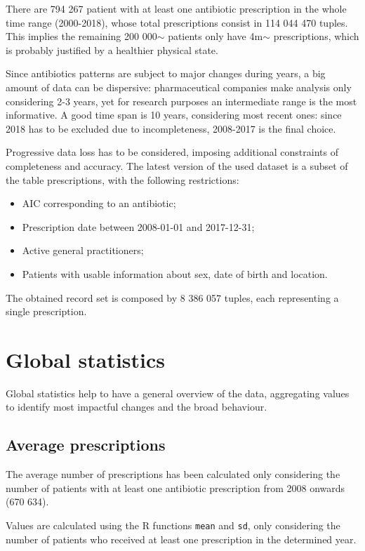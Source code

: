 There are 794 267 patient with at least one antibiotic prescription in the whole time range (2000-2018), whose total prescriptions consist in 114 044 470 tuples. This implies the remaining 200 000$\sim$ patients only have 4m$\sim$ prescriptions, which is probably justified by a healthier physical state.

Since antibiotics patterns are subject to major changes during years, a big amount of data can be dispersive: pharmaceutical companies make analysis only considering 2-3 years, yet for research purposes an intermediate range is the most informative. A good time span is 10 years, considering most recent ones: since 2018 has to be excluded due to incompleteness, 2008-2017 is the final choice.

Progressive data loss has to be considered, imposing additional constraints of completeness and accuracy. The latest version of the used dataset is a subset of the table prescriptions, with the following restrictions:
\begin{itemize}
	\item AIC corresponding to an antibiotic;
	\item Prescription date between 2008-01-01 and 2017-12-31;
	\item Active general practitioners;
	\item Patients with usable information about sex, date of birth and location.
\end{itemize}

The obtained record set is composed by 8 386 057 tuples, each representing a single prescription.

\section{Global statistics}
Global statistics help to have a general overview of the data, aggregating values to identify most impactful changes and the broad behaviour.

\subsection{Average prescriptions}
The average number of prescriptions has been calculated only considering the number of patients with at least one antibiotic prescription from 2008 onwards (670 634). 

Values are calculated using the R functions \texttt{mean} and \texttt{sd}, only considering the number of patients who received at least one prescription in the determined year.

